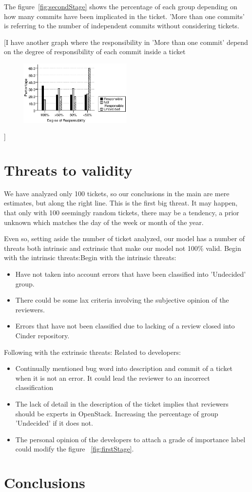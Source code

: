 \documentclass[a4paper]{article}
\begin{document}
The figure~\ref{fig:secondStage} shows the percentage of each group depending on how many commits have been implicated in the ticket. 'More than one commits' is referring to the number of independent commits without considering tickets.

[I have another graph where the responsibility in 'More than one commit' depend on the degree of responsibility of each commit inside a ticket
\begin{figure}[htb]
\centering
\includegraphics[width=0.5\textwidth]{prueba}
\end{figure}
]

\section{Threats to validity}

We have analyzed only 100 tickets, so our conclusions in the main are mere estimates, but along the right line. This is the first big threat. It may happen, that only with 100 seemingly random tickets, there may be a tendency, a prior unknown which matches the day of the week or month of the year.

Even so, setting aside the number of ticket analyzed, our model has a number of threats both intrinsic and extrinsic that make our model not 100\% valid. Begin with the intrinsic threats:Begin with the intrinsic threats:

\begin{itemize}
	\item Have not taken into account errors that have been classified into 'Undecided' group.
	\item There could be some lax criteria involving the subjective opinion of the reviewers. 
	\item Errors that have not been classified due to lacking of a review closed into Cinder repository.
\end{itemize}
	
Following with the extrinsic threats:
	Related to developers:
\begin{itemize}
	\item Continually mentioned bug word into description and commit of a ticket when it is not an error. It could lead the reviewer to an incorrect classification
	\item The lack of detail in the description of the ticket implies that reviewers should be experts in OpenStack. Increasing the percentage of group 'Undecided' if it does not. 
	\item The personal opinion of the developers to attach a grade of importance label could modify the figure ~\ref{fig:firstStage}.
\end{itemize}

\section{Conclusions}
\end{document}
